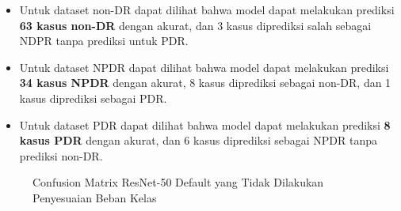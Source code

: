 \begin{itemize}
	\item Untuk dataset non-DR dapat dilihat bahwa model dapat melakukan prediksi \textbf{63 kasus non-DR} dengan akurat, dan 3 kasus diprediksi salah sebagai NDPR tanpa prediksi untuk PDR.
	
	\item Untuk dataset NPDR dapat dilihat bahwa model dapat melakukan prediksi \textbf{34 kasus NPDR} dengan akurat, 8 kasus diprediksi sebagai non-DR, dan 1 kasus diprediksi sebagai PDR.
	
	\item Untuk dataset PDR dapat dilihat bahwa model dapat melakukan prediksi \textbf{8 kasus PDR} dengan akurat, dan 6 kasus diprediksi sebagai NPDR tanpa prediksi non-DR.
\end{itemize}
\pagebreak

\begin{figure}[hbtp]
	\centering
	\qquad
	\qquad
	\caption{Confusion Matrix ResNet-50 Default yang Tidak Dilakukan Penyesuaian Beban Kelas}
	\label{fig:confRes50}
\end{figure}

